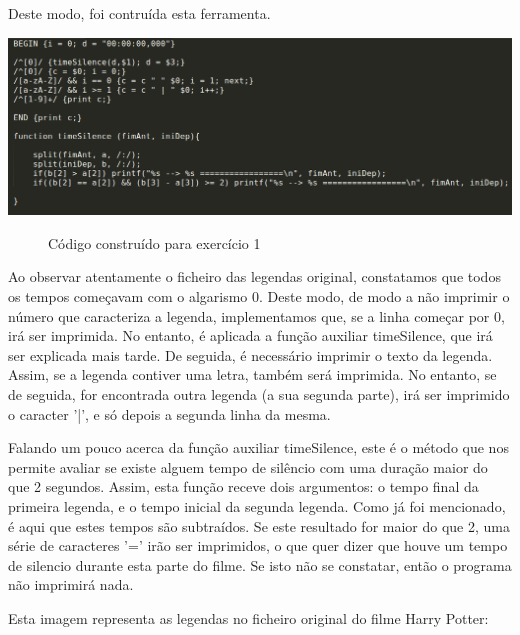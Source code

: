 \documentclass[a4paper]{article}
\begin{document}
Deste modo, foi contruída esta ferramenta.

\begin{center}
	\includegraphics[scale=0.3]{2}
	\begin{figure}[!h]
	\caption{Código construído para exercício 1}
	\end{figure}
\end{center}

Ao observar atentamente o ficheiro das legendas original, constatamos que todos os tempos começavam com o algarismo 0. Deste modo, de modo a não imprimir o número que caracteriza a legenda, implementamos que, se a linha começar por 0, irá ser imprimida. No entanto, é aplicada a função auxiliar timeSilence, que irá ser explicada mais tarde.
De seguida, é necessário imprimir o texto da legenda. Assim, se a legenda contiver uma letra, também será imprimida. No entanto, se de seguida, for encontrada outra legenda (a sua segunda parte), irá ser imprimido o caracter '|', e só depois a segunda linha da mesma.

Falando um pouco acerca da função auxiliar timeSilence, este é o método que nos permite avaliar se existe alguem tempo de silêncio com uma duração maior do que 2 segundos.
Assim, esta função receve dois argumentos: o tempo final da primeira legenda, e o tempo inicial da segunda legenda. Como já foi mencionado, é aqui que estes tempos são subtraídos. Se este resultado for maior do que 2, uma série de caracteres '=' irão ser imprimidos, o que quer dizer que houve um tempo de silencio durante esta parte do filme. Se isto não se constatar, então o programa não imprimirá nada.

\vspace{200px}

Esta imagem representa as legendas no ficheiro original do filme Harry Potter:
\end{document}
